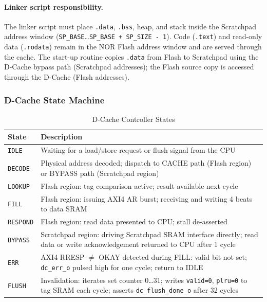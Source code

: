 \paragraph{Linker script responsibility.}
The linker script must place \texttt{.data}, \texttt{.bss}, heap, and
stack inside the Scratchpad address window
(\texttt{SP\_BASE}\ldots\texttt{SP\_BASE + SP\_SIZE - 1}).
Code (\texttt{.text}) and read-only data (\texttt{.rodata}) remain in
the NOR Flash address window and are served through the cache.
The start-up routine copies \texttt{.data} from Flash to Scratchpad using
the D-Cache bypass path (Scratchpad addresses); the Flash source copy is
accessed through the D-Cache (Flash addresses).

\subsubsection{D-Cache State Machine}
\label{subsec:dcacheFsm}

\begin{table}[H]
\caption{D-Cache Controller States}
\label{tab:asDCacheFsm}
\centering
\begin{tabularx}{\textwidth}{|l |X |}
  \hline
  State & Description \\
  \hline
  \hline
  \texttt{IDLE}       & Waiting for a load/store request or flush signal from the CPU \\
  \hline
  \texttt{DECODE}     & Physical address decoded; dispatch to CACHE path (Flash region)
                        or BYPASS path (Scratchpad region) \\
  \hline
  \texttt{LOOKUP}     & Flash region: tag comparison active; result available next cycle \\
  \hline
  \texttt{FILL}       & Flash region: issuing AXI4 AR burst; receiving and writing
                        4 beats to data SRAM \\
  \hline
  \texttt{RESPOND}    & Flash region: read data presented to CPU; stall de-asserted \\
  \hline
  \texttt{BYPASS}     & Scratchpad region: driving Scratchpad SRAM interface directly;
                        read data or write acknowledgement returned to CPU after 1 cycle \\
  \hline
  \texttt{ERR}        & AXI4 RRESP $\neq$ OKAY detected during FILL: valid bit not
                        set; \texttt{dc\_err\_o} pulsed high for one cycle;
                        return to IDLE \\
  \hline
  \texttt{FLUSH}      & Invalidation: iterates set counter 0\ldots31; writes
                        \texttt{valid=0}, \texttt{plru=0} to tag SRAM each cycle;
                        asserts \texttt{dc\_flush\_done\_o} after 32 cycles \\
  \hline
\end{tabularx}
\end{table}

